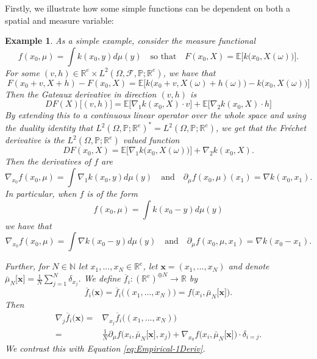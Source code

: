 \documentclass[a4paper,11pt,twoside]{article}
\numberwithin{equation}{section}
\theoremstyle{plain}
\newtheorem{example}[theorem]{Example}
\newcommand{\bE}{\mathbb{E}}
\newcommand{\bN}{\mathbb{N}}
\newcommand{\bP}{\mathbb{P}}
\newcommand{\bR}{\mathbb{R}}
\newcommand{\cF}{\mathcal{F}}
\newcommand{\1}{\mathbbm{1}}
\begin{document}
	Firstly, we illustrate how some simple functions can be dependent on both a spatial and measure variable:
	\begin{example}
		\label{example:Simple_Lions3}
		As a simple example, consider the measure functional
		\begin{equation}
			f(x_0, \mu) = \int k(x_0, y) d\mu(y) \quad \mbox{so that} \quad F(x_0, X) = \bE \Big[ k\big(x_0,  X(\omega) \big) \Big]. 
		\end{equation}
		For some $(v, h) \in \bR^e \times L^2(\Omega, \cF, \bP; \bR^e)$, we have that
		$$
		F(x_0+v, X+h) - F(x_0, X) = \bE\Big[ k\big( x_0 + v, X(\omega) + h(\omega) \big) - k\big( x_0, X(\omega) \big) \Big]
		$$
		Then the Gateaux derivative in direction $(v,h)$ is
		$$
		DF(X) \big[ (v,h) \big] = \bE\Big[ \nabla_1 k(x_0, X) \cdot v \Big] + \bE\Big[ \nabla_2 k(x_0, X) \cdot h \Big]
		$$
		By extending this to a continuous linear operator over the whole space and using the duality identity that $L^2(\Omega, \bP; \bR^e)^* = L^2(\Omega, \bP; \bR^e)$, we get that the Fr\'echet derivative is the $L^2(\Omega, \bP; \bR^e)$ valued function
		$$
		DF(x_0, X) = \bE\Big[ \nabla_1 k\big( x_0, X(\omega) \big) \Big] + \nabla_2 k(x_0, X). 
		$$
		Then the derivatives of $f$ are
		$$
		\nabla_{x_0} f(x_0, \mu) = \int \nabla_1 k(x_0, y) d\mu(y)
		\quad\mbox{and} \quad
		\partial_\mu f(x_0, \mu)(x_1) = \nabla k(x_0, x_1). 
		$$
		In particular, when $f$ is of the form
		$$
		f(x_0, \mu) = \int k(x_0 - y) d\mu(y)
		$$
		we have that
		$$
		\nabla_{x_0} f(x_0, \mu) = \int \nabla k(x_0 - y) d\mu(y) 
		\quad \mbox{and} \quad
		\partial_{\mu} f(x_0, \mu, x_1) = \nabla k(x_0 - x_1). 
		$$
		
		Further, for $N\in \bN$ let $x_1, ..., x_N \in  \bR^e$, let $\boldsymbol{x} = (x_1, ..., x_N)$ and denote $\bar{\mu}_N\big[ \boldsymbol{x} \big] = \tfrac{1}{N} \sum_{j=1}^N \delta_{x_j}$. We define $\overline{f}_i: (\bR^e)^{\oplus N} \to \bR$ by
		\begin{equation}
			\label{eq:Empirical-Dist_0}
			\overline{f}_i\Big( \boldsymbol{x} \Big) = \overline{f}_i\Big( (x_1, ..., x_N) \Big) = f\Big(x_i, \bar{\mu}_N\big[ \boldsymbol{x} \big] \Big). 
		\end{equation}
		Then
		\begin{align}
			\nonumber
			\nabla_{j} \overline{f}_i\big( \boldsymbol{x} \big) =& \nabla_{x_j} \overline{f}_i\big( (x_1, ..., x_N) \big) 
			\\
			\label{eq:Empirical-1Deriv_0}
			=& \tfrac{1}{N} \partial_\mu f\Big( x_i, \bar{\mu}_N\big[ \boldsymbol{x} \big], x_j \Big) + \nabla_{x_0} f\Big( x_i, \bar{\mu}_N\big[ \boldsymbol{x} \big] \Big) \cdot \delta_{i = j}. 
		\end{align}
		We contrast this with Equation \eqref{eq:Empirical-1Deriv}. 
	\end{example}
	
\end{document}
